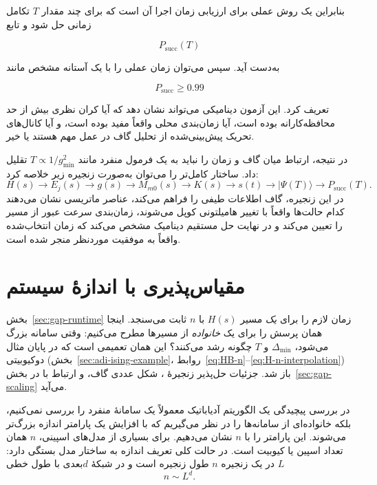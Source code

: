 بنابراین یک روش عملی برای ارزیابی زمان اجرا آن است که برای چند
مقدار $T$ تکامل زمانی حل شود و تابع

$$
P_{\mathrm{succ}}(T)
$$

به‌دست آید. سپس می‌توان زمان عملی را با یک آستانه مشخص مانند

$$
P_{\mathrm{succ}}\geq0.99
$$

تعریف کرد. این آزمون دینامیکی می‌تواند نشان دهد که آیا کران نظری
بیش از حد محافظه‌کارانه بوده است، آیا زمان‌بندی محلی واقعاً مفید
بوده است، و آیا کانال‌های تحریک پیش‌بینی‌شده از تحلیل گاف در عمل
مهم هستند یا خیر.

در نتیجه، ارتباط میان گاف و زمان را نباید به یک فرمول منفرد مانند
$T\propto1/g_{\min}^2$ تقلیل داد. ساختار کامل‌تر را می‌توان به‌صورت
زنجیره زیر خلاصه کرد:
\begin{equation}
	H(s)
	\longrightarrow
	{E_j(s)}
	\longrightarrow
	g(s)
	\longrightarrow
	M_{m0}(s)
	\longrightarrow
	K(s)
	\longrightarrow
	s(t)
	\longrightarrow
	|\Psi(T)\rangle
	\longrightarrow
	P_{\mathrm{succ}}(T).
\end{equation}
در این زنجیره، گاف اطلاعات طیفی را فراهم می‌کند، عناصر ماتریسی
نشان می‌دهند کدام حالت‌ها واقعاً با تغییر هامیلتونی کوپل می‌شوند،
زمان‌بندی سرعت عبور از مسیر را تعیین می‌کند و در نهایت حل مستقیم
دینامیک مشخص می‌کند که زمان انتخاب‌شده واقعاً به موفقیت موردنظر
منجر شده است.




\section{مقیاس‌پذیری با اندازهٔ سیستم}
\label{sec:complexity-scaling}

بخش~\ref{sec:gap-runtime} زمان لازم را برای \emph{یک} مسیر $H(s)$ با $n$ ثابت می‌سنجد.
اینجا همان پرسش را برای یک \emph{خانواده} از مسیرها مطرح می‌کنیم: وقتی سامانه بزرگ می‌شود، $\Delta_{\min}$ و $T$ چگونه رشد می‌کنند؟
این همان تعمیمی است که در پایان مثال دوکیوبیتی (بخش~\ref{sec:adi-ising-example}، روابط~\eqref{eq:HB-n}--\eqref{eq:H-n-interpolation}) باز شد.
جزئیات حل‌پذیر زنجیرهٔ ، شکل عددی گاف، و ارتباط با  در بخش~\ref{sec:gap-scaling} می‌آید.

در بررسی پیچیدگی یک الگوریتم آدیاباتیک معمولاً یک سامانهٔ منفرد را بررسی نمی‌کنیم، بلکه خانواده‌ای از سامانه‌ها را در نظر می‌گیریم که با افزایش یک پارامتر اندازه بزرگ‌تر می‌شوند. این پارامتر را با $n$ نشان می‌دهیم. برای بسیاری از مدل‌های اسپینی، $n$ همان تعداد اسپین یا کیوبیت است. در حالت کلی تعریف اندازه به ساختار مدل بستگی دارد: در یک زنجیره $n$ طول زنجیره است و در شبکهٔ $d$بعدی با طول خطی $L$
\begin{equation}
	n\sim L^d.
\end{equation}

